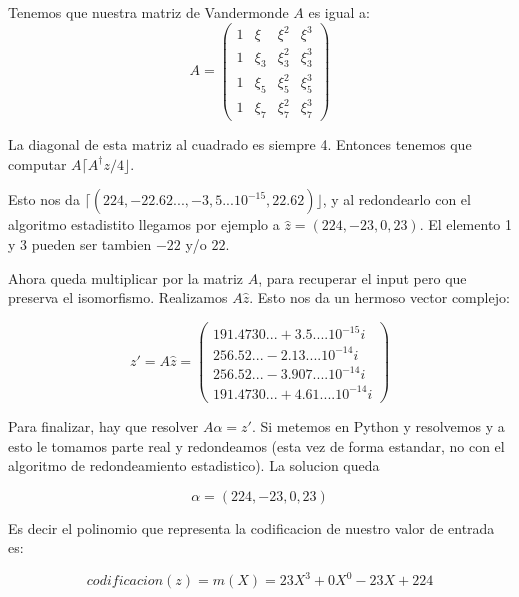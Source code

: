 \documentclass[12pt, oneside]{article}
\begin{document}
Tenemos que nuestra matriz de Vandermonde $A$ es igual a:
\begin{equation*}
    A=
    \begin{pmatrix}
        1 & \xi &  \xi^2 &  \xi^3 \\
        1 & \xi_3 & \xi_3^2 &\xi_3^3\\
        1 & \xi_5 & \xi_5^2 &\xi_5^3\\
        1 & \xi_7 & \xi_7^2 &\xi_7^3
    \end{pmatrix}
    \label{eq:vandermonde_ej}
\end{equation*}

La diagonal de esta matriz al cuadrado es siempre 4.
Entonces tenemos que computar $A\lceil A^\dagger z/4  \rfloor$.

Esto nos da $\lceil(224, -22.62..., -3,5...10^{-15}, 22.62)\rfloor$, y al redondearlo
con el algoritmo estadistito llegamos por ejemplo a $\hat{z}=(224, -23, 0, 23)$.
El elemento 1 y 3 pueden ser tambien $-22$ y/o $22$.


Ahora queda multiplicar por la matriz $A$, para recuperar el input pero que preserva
el isomorfismo.
Realizamos $A\hat{z}$.
Esto nos da un hermoso vector complejo:

\begin{equation*}
    z'= A\hat{z}=
    \begin{pmatrix}
        191.4730... + 3.5....10^{-15}i \\
        256.52... - 2.13....10^{-14}i \\
        256.52... - 3.907....10^{-14}i \\
        191.4730... + 4.61....10^{-14}i
    \end{pmatrix}
    \label{eq:vandermonde_ej}
\end{equation*}

Para finalizar, hay que resolver $A\alpha = z'$.
Si metemos en Python y resolvemos y a esto le tomamos parte real y redondeamos
(esta vez de forma estandar, no con el algoritmo de redondeamiento estadistico).
La solucion queda

\begin{equation*}
    \alpha = (224, -23, 0, 23)
\end{equation*}

Es decir el polinomio que representa la codificacion de nuestro valor de entrada es:


\begin{equation*}
    codificacion(z) = m(X) = 23X^3+0X^0-23X+224
\end{equation*}
\end{document}
